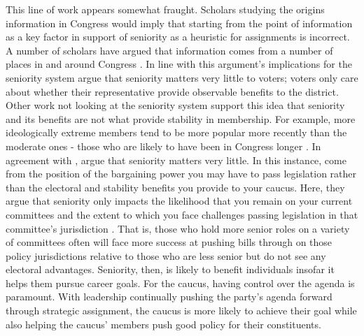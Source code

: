 \documentclass [12pt]{article}
\begin{document}
This line of work appears somewhat fraught. Scholars studying the origins information in Congress would imply that starting from the point of information as a key factor in support of seniority as a heuristic for assignments is incorrect. A number of scholars have argued that information comes from a number of places in and around Congress \cite{Austen-Smith1993,Hall2006,McCrain2018}. In line with this argument's implications for the seniority system  argue that seniority matters very little to voters; voters only care about whether their representative provide observable benefits to the district. Other work not looking at the seniority system support this idea that seniority and its benefits are not what provide stability in membership. For example, more ideologically extreme members tend to be more popular more recently than the moderate ones - those who are likely to have been in Congress longer \cite{Utych2019}. In agreement with ,  argue that seniority matters very little. In this instance,  come from the position of the bargaining power you may have to pass legislation rather than the electoral and stability benefits you provide to your caucus. Here, they argue that seniority only impacts the likelihood that you remain on your current committees and the extent to which you face challenges passing legislation in that committee's jurisdiction \cite{Kellermann2009}. That is, those who hold more senior roles on a variety of committees often will face more success at pushing bills through on those policy jurisdictions relative to those who are less senior but do not see any electoral advantages. Seniority, then, is likely to benefit individuals insofar it helps them pursue career goals. For the caucus, having control over the agenda is paramount. With leadership continually pushing the party's agenda forward through strategic assignment, the caucus is more likely to achieve their goal while also helping the caucus' members push good policy for their constituents.
\end{document}
